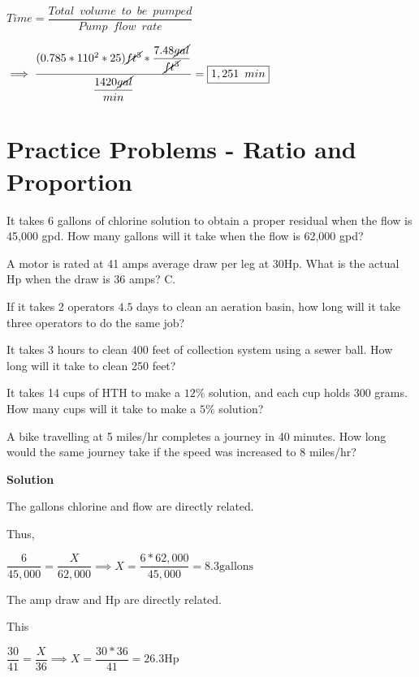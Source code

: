 \vspace{0.3cm}

$Time=\dfrac{Total \enspace volume \enspace to \enspace be \enspace pumped}{Pump \enspace flow \enspace rate}$

\vspace{0.3cm}
$\implies \dfrac{(0.785*110^2*25)\cancel{ft^3}*\dfrac{7.48\cancel{gal}}{\cancel{ft^3}}}{\dfrac{1420\cancel{gal}}{min}}= \boxed{1,251 \enspace min}$\\
\vspace{1cm}
\section*{Practice Problems - Ratio and Proportion}

It takes 6 gallons of chlorine solution to obtain a proper residual when the flow is 45,000 gpd. How many gallons will it take when the flow is 62,000 gpd?

A motor is rated at 41 amps average draw per leg at $30 \mathrm{Hp}$. What is the actual $\mathrm{Hp}$ when the draw is 36 amps? C. 

If it takes 2 operators $4.5$ days to clean an aeration basin, how long will it take three operators to do the same job?

It takes 3 hours to clean 400 feet of collection system using a sewer ball. How long will it take to clean 250 feet?

It takes 14 cups of $\mathrm{HTH}$ to make a $12 \%$ solution, and each cup holds 300 grams. How many cups will it take to make a $5 \%$ solution?

A bike travelling at 5 miles/hr completes a journey in 40 minutes. How long would the same journey take if the speed was increased to 8 miles/hr?

\vspace{1cm}

\textbf{Solution}

The gallons chlorine and flow are directly related. 

Thus,

$\dfrac{6}{45,000}=\dfrac{X}{62,000} \implies X=\dfrac{6*62,000}{45,000}=8.3 \mathrm{gallons}$


\vspace{0.5cm}

The amp draw and Hp are directly related.

This

$\dfrac{30}{41}=\dfrac{X}{36} \implies X=\dfrac{30*36}{41}=26.3 \mathrm{Hp}$

